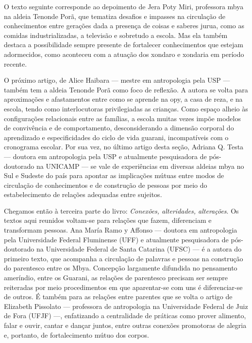 O texto seguinte corresponde ao depoimento de Jera Poty Miri, professora
mbya na aldeia Tenonde Porã, que tematiza desafios e impasses na
circulação de conhecimentos entre gerações dada a presença de coisas e
saberes jurua, como as comidas industrializadas, a televisão e
sobretudo a escola. Mas ela também destaca a possibilidade sempre
presente de fortalecer conhecimentos que estejam adormecidos, como
aconteceu com a atuação dos xondaro e xondaria em período recente. 

O próximo artigo, de Alice Haibara — mestre em antropologia pela USP —
também tem a aldeia Tenonde Porã como foco de reflexão. A autora se
volta para aproximações e afastamentos entre como se aprende na opy, a
casa de reza, e na escola, tendo como interlocutoras privilegiadas as
crianças. Como espaço alheio às configurações relacionais entre as
famílias, a escola muitas vezes impõe modelos de convivência e de
comportamento, desconsiderando a dimensão corporal do aprendizado e
especificidades do ciclo de vida guarani, incompatíveis com o
cronograma escolar. Por sua vez, no último artigo desta seção, Adriana
Q. Testa — doutora em antropologia pela USP e atualmente pesquisadora
de pós-doutorado na UNICAMP — se vale de experiências em diversas
aldeias mbya no Sul e Sudeste do país para apontar as implicações
mútuas entre modos de circulação de conhecimentos e de construção de
pessoas por meio do estabelecimento de relações adequadas entre
sujeitos. 

Chegamos então à terceira parte do livro: \emph{Conexões, alteridades,
alterações}. Os textos aqui reunidos voltam-se para relações que fazem,
diferenciam e transformam pessoas. Ana María Ramo y Affonso — doutora
em antropologia pela Universidade Federal Fluminense (UFF) e atualmente
pesquisadora de pós-doutorado na Universidade Federal de Santa Catarina
(UFSC)  — é a autora do primeiro texto, que acompanha a circulação de
palavras e pessoas na construção do parentesco entre os Mbya. Concepção
largamente difundida no pensamento ameríndio, entre os Guarani, as relações
de parentesco precisam ser sempre reiteradas por meio procedimentos em
que aparentar-se com uns é diferenciar-se de outros. É também para as
relações entre parentes que se volta o artigo de Elizabeth Pissolato —
professora de antropologia na Universidade Federal de Juiz de Fora
(UFJF) —, enfatizando a centralidade de práticas como prover alimento,
falar e ouvir, cantar e dançar juntos, entre outras conexões promotoras
de alegria e, portanto, de fortalecimento mútuo dos corpos.


